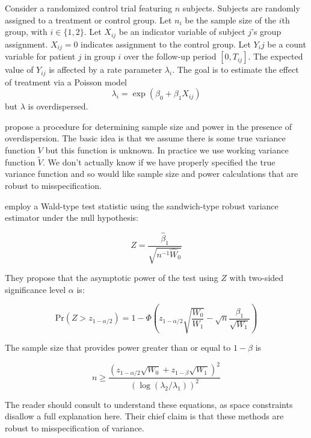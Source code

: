 \documentclass{article}
\begin{document}
Consider a randomized control trial featuring $n$ subjects. 
Subjects are randomly assigned to a treatment or control group.
Let $n_i$ be the sample size of the $i$th group, with $i \in \{1, 2\}$.
Let $X_{ij}$ be an indicator variable of subject $j$'s group assignment. 
$X_{ij}=0$ indicates assignment to the control group.
Let $Y_ij$ be a count variable for patient $j$ in group $i$ over the follow-up period $[0, T_{ij}]$.
The expected value of $Y_{ij}$ is affected by a rate parameter $\lambda_i$.
The goal is to estimate the effect of treatment via a Poisson model 
$$
\lambda_i 
= \exp{(\beta_0 + \beta_1 X_{ij})}
$$
but $\lambda$ is overdispersed. 

\cite{igeta2018} propose a procedure for determining sample size and power in
the presence of overdispersion. The basic idea is that we assume there is some 
true variance function $V$ but this function is unknown. In practice we use
working variance function $\tilde{V}$. We don't actually know if we have
properly specified the true variance function and so would like sample size and power
calculations that are robust to misspecification.

\cite{igeta2018} employ a Wald-type test statistic using the sandwich-type
robust variance estimator under the null hypothesis:

\begin{equation}
	Z = \frac{\hat{\beta}_1}{\sqrt{n^{-1} \hat{W}_0}}
\end{equation}

They propose that the asymptotic power of the test using $Z$ 
with two-sided significance level $\alpha$ is:

\begin{equation}
	\mathrm{Pr} \left( Z > z_{1 - \alpha/ 2} \right) 
	=
	1 - \Phi 
	\left(
	z_{1 - \alpha / 2}
	\sqrt{\frac{W_0}{W_1}}
	-
	\sqrt{n}
	\frac{\beta_1}{\sqrt{W_1}}
	\right)
\end{equation}

The sample size that provides power greater than or equal to $1 - \beta$ is

\begin{equation}
	n \geq \frac{(z_{1 - \alpha / 2} \sqrt{W_0} + z_{1 - \beta}
	\sqrt{W_1})^2}{\left( \log (\lambda_2 / \lambda_1 ) \right)^2}
\end{equation}

The reader should consult \cite{igeta2018} to understand these equations, as
space constraints disallow a full explanation here. Their chief claim
is that these methods are robust to misspecification of variance.
\end{document}
